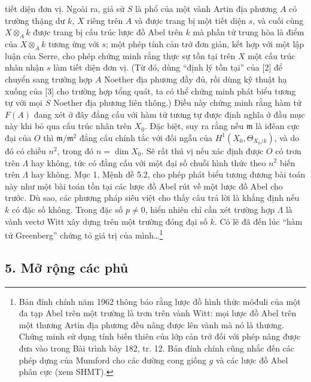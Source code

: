 tiết diện đơn vị. Ngoài ra, giả sử $S$ là phổ của một vành Artin địa phương
$A$ có trường thặng dư $k$, $X$ riêng trên $A$ và được trang bị một tiết diện
$s$, và cuối cùng $X\otimes_Ak$ được trang bị cấu trúc lược đồ Abel trên $k$
mà phần tử trung hòa là điểm của $X\otimes_Ak$ tương ứng với $s$; một phép
tính cản trở đơn giản, kết hợp với một lập luận của Serre, cho phép chứng minh
rằng thực sự tồn tại trên $X$ một cấu trúc nhân nhận $s$ làm tiết diện đơn vị.
(Từ đó, dùng ``định lý tồn tại'' của [2] để chuyển sang trường hợp $A$ Noether
địa phương đầy đủ, rồi dùng kỹ thuật hạ xuống của [3] cho trường hợp tổng quát,
ta có thể chứng minh phát biểu tương tự với mọi $S$ Noether địa phương liên
thông.) Điều này chứng minh rằng hàm tử $F(A)$ đang xét ở đây đẳng cấu với hàm
tử tương tự được định nghĩa ở đầu mục này khi bỏ qua cấu trúc nhân trên $X_0$.
Đặc biệt, suy ra rằng nếu $\mathfrak m$ là iđêan cực đại của $O$ thì
$\mathfrak m/\mathfrak m^2$ đẳng cấu chính tắc với đối ngẫu của
$H^1(X_0,\Theta_{X_0/k})$, và do đó có chiều $n^2$, trong đó
$n=\dim X_0$. Sẽ rất thú vị nếu xác định được $O$ có trơn trên $\Lambda$ hay
không, tức có đẳng cấu với một đại số chuỗi hình thức theo $n^2$ biến trên
$\Lambda$ hay không. Mục 1, Mệnh đề 5.2, cho phép phát biểu tương đương bài
toán này như một bài toán tồn tại các lược đồ Abel rút về một lược đồ Abel cho
trước. Dù sao, các phương pháp siêu việt cho thấy câu trả lời là khẳng định nếu
$k$ có đặc số không. Trong đặc số $p\ne0$, hiển nhiên chỉ cần xét trường hợp
$\Lambda$ là vành vectơ Witt xây dựng trên một trường đóng đại số $k$. Có lẽ
đã đến lúc ``hàm tử Greenberg'' chứng tỏ giá trị của mình\ldots\footnote{Bản
đính chính năm 1962 thông báo rằng lược đồ hình thức môđuli của một đa tạp Abel
trên một trường là trơn trên vành Witt: mọi lược đồ Abel trên một thương Artin
địa phương đều nâng được lên vành mà nó là thương. Chứng minh sử dụng tính
biến thiên của lớp cản trở đối với phép nâng được đưa vào trong Bài trình bày
182, tr. 12. Bản đính chính cũng nhắc đến các phép dựng của Mumford cho các
đường cong giống $g$ và các lược đồ Abel phân cực (xem SHMT).}

\subsection*{5. Mở rộng các phủ}

